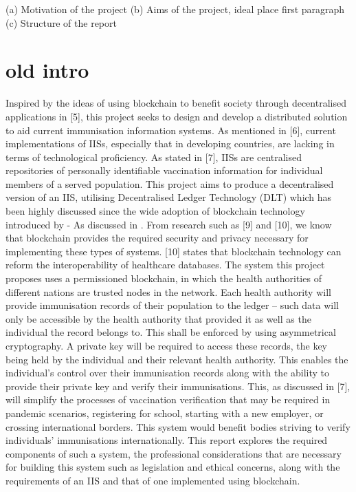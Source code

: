 (a) Motivation of the project \linebreak[1]
(b) Aims of the project, ideal place first paragraph \linebreak[1]
(c) Structure of the report 

\section{old intro}
Inspired by the ideas of using blockchain to benefit society
through decentralised applications in [5], this project seeks to
design and develop a distributed solution to aid current
immunisation information systems. As mentioned in [6],
current implementations of IISs, especially that in developing
countries, are lacking in terms of technological proficiency.
As stated in [7], IISs are centralised repositories of personally
identifiable vaccination information for individual members of
a served population. This project aims to produce a
decentralised version of an IIS, utilising Decentralised Ledger Technology (DLT) 
which has been highly discussed since the wide adoption of blockchain technology introduced by \cite{nakamoto_bitcoin_2019} - As discussed in \cite{sunyaev_distributed_2020}.
From research such as [9] and [10], we know that blockchain provides the
required security and privacy necessary for implementing
these types of systems. [10] states that blockchain technology
can reform the interoperability of healthcare databases.
The system this project proposes uses a permissioned
blockchain, in which the health authorities of different nations
are trusted nodes in the network. Each health authority will
provide immunisation records of their population to the ledger
– such data will only be accessible by the health authority that
provided it as well as the individual the record belongs to.
This shall be enforced by using asymmetrical cryptography. A
private key will be required to access these records, the key
being held by the individual and their relevant health
authority. This enables the individual’s control over their
immunisation records along with the ability to provide their
private key and verify their immunisations. This, as discussed
in [7], will simplify the processes of vaccination verification
that may be required in pandemic scenarios, registering for
school, starting with a new employer, or crossing international
borders. This system would benefit bodies striving to verify
individuals’ immunisations internationally.
This report explores the required components of such a
system, the professional considerations that are necessary for
building this system such as legislation and ethical concerns,
along with the requirements of an IIS and that of one
implemented using blockchain.

